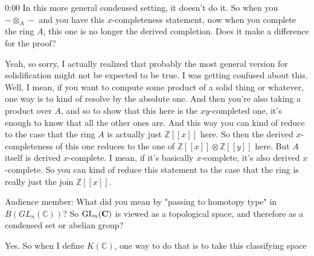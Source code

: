 \begin{unfinished}{0:00}
In this more general condensed setting, it doesn't do it. So when you $-\otimes_A-$ and you have this $x$-completeness statement, now when you complete the ring $A$, this one is no longer the derived completion. Does it make a difference for the proof?

Yeah, so sorry, I actually realized that probably the most general version for solidification might not be expected to be true. I was getting confused about this. Well, I mean, if you want to compute some product of a solid thing or whatever, one way is to kind of resolve by the absolute one. And then you're also taking a product over $A$, and so to show that this here is the $xy$-completed one, it's enough to know that all the other ones are. And this way you can kind of reduce to the case that the ring $A$ is actually just $\mathbb{Z}[[x]]$ here. So then the derived $x$-completeness of this one reduces to the one of $\mathbb{Z}[[x]] \otimes \mathbb{Z}[[y]]$ here. But $A$ itself is derived $x$-complete. I mean, if it's basically $x$-complete, it's also derived $x$-complete. So you can kind of reduce this statement to the case that the ring is really just the join $\mathbb{Z}[[x]]$.

Audience member: What did you mean by "passing to homotopy type" in $B(GL_n(\mathbb{C}))$? So $\operatorname{GL}_n(\mathbf C)$ is viewed as a topological space, and therefore as a condensed set or abelian group?

Yes. So when I define $K(\mathbb{C})$, one way to do that is to take this classifying space
\end{unfinished}